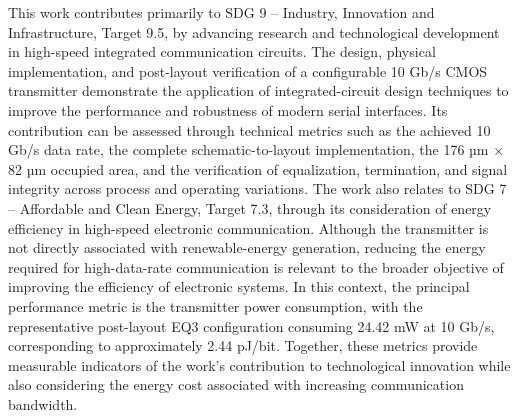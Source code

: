 This work contributes primarily to SDG 9 -- Industry, Innovation and Infrastructure, Target 9.5, by advancing research and technological development in high-speed integrated communication circuits. The design, physical implementation, and post-layout verification of a configurable 10 Gb/s CMOS transmitter demonstrate the application of integrated-circuit design techniques to improve the performance and robustness of modern serial interfaces. Its contribution can be assessed through technical metrics such as the achieved 10 Gb/s data rate, the complete schematic-to-layout implementation, the 176 µm $\times$ 82 µm occupied area, and the verification of equalization, termination, and signal integrity across process and operating variations. The work also relates to SDG 7 -- Affordable and Clean Energy, Target 7.3, through its consideration of energy efficiency in high-speed electronic communication. Although the transmitter is not directly associated with renewable-energy generation, reducing the energy required for high-data-rate communication is relevant to the broader objective of improving the efficiency of electronic systems. In this context, the principal performance metric is the transmitter power consumption, with the representative post-layout EQ3 configuration consuming 24.42 mW at 10 Gb/s, corresponding to approximately 2.44 pJ/bit. Together, these metrics provide measurable indicators of the work's contribution to technological innovation while also considering the energy cost associated with increasing communication bandwidth.